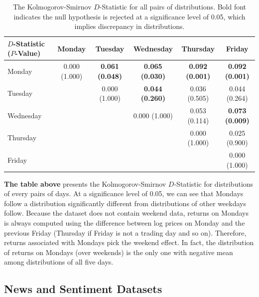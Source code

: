 \documentclass[12pt]{article}
\begin{document}
	\begin{table}[H]
		\small
		\centering
		\begin{tabular}{l|c|c|c|c|c}
			\toprule
			$D$-Statistic ($P$-Value)& Monday & Tuesday & Wednesday & Thursday & Friday \\
			\midrule
			Monday    & 0.000 (1.000) & \textbf{0.061 (0.048)} & \textbf{0.065 (0.030)} & \textbf{0.092 (0.001)} & \textbf{0.092 (0.001)} \\
			Tuesday   &               & 0.000 (1.000) & \textbf{0.044 (0.260)} & 0.036 (0.505) & 0.044 (0.264) \\
			Wednesday &               &               & 0.000 (1.000) & 0.053 (0.114) & \textbf{0.073 (0.009)} \\
			Thursday  &               &               &               & 0.000 (1.000) & 0.025 (0.900) \\
			Friday    &               &               &               &               & 0.000 (1.000) \\
			\bottomrule
		\end{tabular}
		\caption{The Kolmogorov-Smirnov $D$-Statistic for all pairs of distributions. Bold font indicates the null hypothesis is rejected at a significance level of 0.05, which implies discrepancy in distributions.}
	\end{table}
	\textbf{The table above} presents the Kolmogorov-Smirnov $D$-Statistic for distributions of every pairs of days. At a significance level of 0.05, we can see that Mondays follow a distribution significantly different from distributions of other weekdays follow. Because the dataset does not contain weekend data, returns on Mondays is always computed using the difference between log prices on Monday and the previous Friday (Thursday if Friday is not a trading day and so on). Therefore, returns associated with Mondays pick the weekend effect. In fact, the distribution of returns on Mondays (over weekends) is the only one with negative mean among distributions of all five days.

	\subsection{News and Sentiment Datasets}
\end{document}
